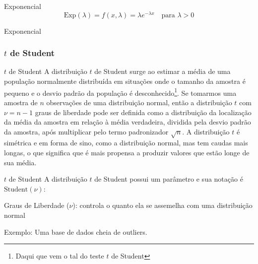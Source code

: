 \begin{frame}{Exponencial}
    $$\text{Exp}(\lambda) = f(x, \lambda) = \lambda e^{-\lambda x} \quad \text{para $\lambda > 0$}$$
\end{frame}

\begin{frame}{Exponencial}
    \centering
\end{frame}

\subsubsection{$t$ de Student}
\begin{frame}{$t$ de Student}
    A distribuição $t$ de Student surge ao estimar a média de uma população
    normalmente distribuída em situações onde o tamanho da amostra é pequeno e o
    desvio padrão da população é
    desconhecido\footnote{Daqui que vem o tal do teste $t$ de Student}.
    \vfill
    Se tomarmos uma amostra de $n$ observações de uma distribuição normal,
    então a distribuição $t$ com $\nu = n-1$ graus de liberdade pode ser definida
    como a distribuição da localização da média da amostra em relação à média
    verdadeira, dividida pela desvio padrão da amostra, após multiplicar
    pelo termo padronizador $\sqrt{n}$.
    \vfill
    A distribuição $t$ é simétrica e em forma de sino, como a distribuição normal,
    mas tem caudas mais longas, o que significa que é mais propensa a produzir
    valores que estão longe de sua média.
\end{frame}

\begin{frame}{$t$ de Student}
    A distribuição $t$ de Student possui um parâmetro e sua notação é
    $\text{Student}(\nu)$:
    \begin{vfilleditems}
        \item Graus de Liberdade ($\nu$): controla o quanto ela se assemelha com uma distribuição normal
    \end{vfilleditems}
    \vfill
    Exemplo: Uma base de dados cheia de outliers.
\end{frame}

